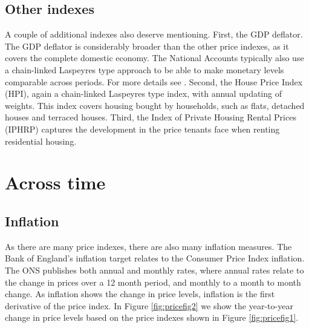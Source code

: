 \documentclass[
]{book}
\begin{document}
\hypertarget{other-indexes-1}{%
\subsection*{Other indexes}\label{other-indexes-1}}

A couple of additional indexes also deserve mentioning. First, the GDP deflator. The GDP deflator is considerably broader than the other price indexes, as it covers the complete domestic economy. The National Accounts typically also use a chain-linked Laspeyres type approach to be able to make monetary levels comparable across periods. For more details see \citep{gdpons}. Second, the House Price Index (HPI), again a chain-linked Laspeyres type index, with annual updating of weights. This index covers housing bought by households, such as flats, detached houses and terraced houses. Third, the Index of Private Housing Rental Prices (IPHRP) captures the development in the price tenants face when renting residential housing.

\hypertarget{across-time}{%
\section{Across time}\label{across-time}}

\hypertarget{inflation}{%
\subsection*{Inflation}\label{inflation}}

As there are many price indexes, there are also many inflation measures. The Bank of England's inflation target relates to the Consumer Price Index inflation. The ONS publishes both annual and monthly rates, where annual rates relate to the change in prices over a 12 month period, and monthly to a month to month change. As inflation shows the change in price levels, inflation is the first derivative of the price index. In Figure \ref{fig:pricefig2} we show the year-to-year change in price levels based on the price indexes shown in Figure \ref{fig:pricefig1}.
\end{document}
